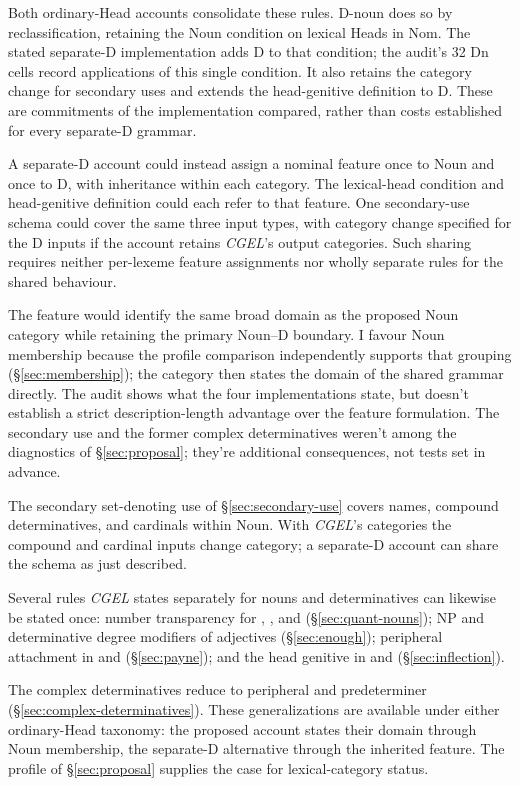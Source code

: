 \documentclass[12pt]{article}
\begin{document}
Both ordinary-Head accounts consolidate these rules. D-noun does so by reclassification, retaining the Noun condition on lexical Heads in Nom. The stated separate-D implementation adds D to that condition; the audit's 32 Dn cells record applications of this single condition. It also retains the category change for secondary uses and extends the head-genitive definition to D. These are commitments of the implementation compared, rather than costs established for every separate-D grammar.

A separate-D account could instead assign a nominal feature once to Noun and once to D, with inheritance within each category. The lexical-head condition and head-genitive definition could each refer to that feature. One secondary-use schema could cover the same three input types, with category change specified for the D inputs if the account retains \textit{CGEL}'s output categories. Such sharing requires neither per-lexeme feature assignments nor wholly separate rules for the shared behaviour.

The feature would identify the same broad domain as the proposed Noun category while retaining the primary Noun--D boundary. I favour Noun membership because the profile comparison independently supports that grouping (§\ref{sec:membership}); the category then states the domain of the shared grammar directly. The audit shows what the four implementations state, but doesn't establish a strict description-length advantage over the feature formulation. The secondary use and the former complex determinatives weren't among the diagnostics of §\ref{sec:proposal}; they're additional consequences, not tests set in advance.

The secondary set-denoting use of §\ref{sec:secondary-use} covers names, compound determinatives, and cardinals within Noun. With \textit{CGEL}'s categories the compound and cardinal inputs change category; a separate-D account can share the schema as just described.

Several rules \textit{CGEL} states separately for nouns and determinatives can likewise be stated once: number transparency for , , and  (§\ref{sec:quant-nouns}); NP and determinative degree modifiers of adjectives (§\ref{sec:enough}); peripheral attachment in  and  (§\ref{sec:payne}); and the head genitive in  and  (§\ref{sec:inflection}).

The complex determinatives reduce to peripheral  and predeterminer  (§\ref{sec:complex-determinatives}). These generalizations are available under either ordinary-Head taxonomy: the proposed account states their domain through Noun membership, the separate-D alternative through the inherited feature. The profile of §\ref{sec:proposal} supplies the case for lexical-category status.
\end{document}
